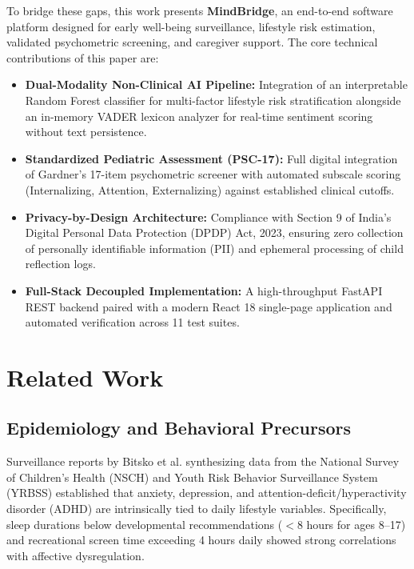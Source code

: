 \documentclass[conference]{IEEEtran}
\begin{document}
To bridge these gaps, this work presents \textbf{MindBridge}, an end-to-end software platform designed for early well-being surveillance, lifestyle risk estimation, validated psychometric screening, and caregiver support. The core technical contributions of this paper are:
\begin{itemize}
    \item \textbf{Dual-Modality Non-Clinical AI Pipeline:} Integration of an interpretable Random Forest classifier for multi-factor lifestyle risk stratification alongside an in-memory VADER lexicon analyzer for real-time sentiment scoring without text persistence.
    \item \textbf{Standardized Pediatric Assessment (PSC-17):} Full digital integration of Gardner's 17-item psychometric screener with automated subscale scoring (Internalizing, Attention, Externalizing) against established clinical cutoffs.
    \item \textbf{Privacy-by-Design Architecture:} Compliance with Section 9 of India's Digital Personal Data Protection (DPDP) Act, 2023, ensuring zero collection of personally identifiable information (PII) and ephemeral processing of child reflection logs.
    \item \textbf{Full-Stack Decoupled Implementation:} A high-throughput FastAPI REST backend paired with a modern React 18 single-page application and automated verification across 11 test suites.
\end{itemize}

\section{Related Work}
\label{sec:related}

\subsection{Epidemiology and Behavioral Precursors}
Surveillance reports by Bitsko et al. \cite{bitsko2022mental} synthesizing data from the National Survey of Children's Health (NSCH) and Youth Risk Behavior Surveillance System (YRBSS) established that anxiety, depression, and attention-deficit/hyperactivity disorder (ADHD) are intrinsically tied to daily lifestyle variables. Specifically, sleep durations below developmental recommendations ($<8$ hours for ages 8--17) and recreational screen time exceeding 4 hours daily showed strong correlations with affective dysregulation.
\end{document}
